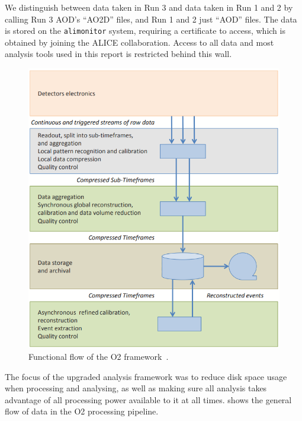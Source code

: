 \documentclass[11pt]{article}
\numberwithin{equation}{section}
\numberwithin{figure}{section}
\numberwithin{table}{section}
\begin{document}
We distinguish between data taken in Run 3 and data taken in Run 1 and 2 by calling Run 3 AOD's ``AO2D'' files, and Run 1 and 2 just ``AOD'' files. The data is stored on the \texttt{alimonitor} system, requiring a certificate to access, which is obtained by joining the ALICE collaboration. Access to all data and most analysis tools used in this report is restricted behind this wall. 

\begin{figure}[h]
    \begin{center}
        \includegraphics[width=.6\textwidth]{Figs/O2_flow.png}
        \caption{Functional flow of the O2 framework~\cite{O2_Upgrade_TDR}.}
        \label{fig:O2_flow}
    \end{center}
\end{figure}

The focus of the upgraded analysis framework was to reduce disk space usage when processing and analysing, as well as making sure all analysis takes advantage of all processing power available to it at all times.  shows the general flow of data in the O2 processing pipeline.





\printbibliography
\end{document}
